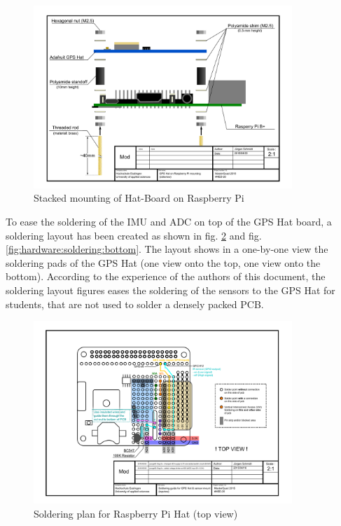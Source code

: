 \begin{figure}[H]
    \centering
    \includegraphics[width=0.87\textwidth]{fig/ch-rpi-hardware/A4_tech_draw_sideview_stackedMount}
    \caption{Stacked mounting of Hat-Board on Raspberry Pi}
    \label{fig:hardware:stackedMount}
\end{figure}

To ease the soldering of the IMU and ADC on top of the GPS Hat board, a soldering layout has been created as shown in fig. \ref{fig:hardware:soldering:top} and fig. \ref{fig:hardware:soldering:bottom}. The layout shows in a one-by-one view the soldering pads of the GPS Hat (one view onto the top, one view onto the bottom). According to the experience of the authors of this document, the soldering layout figures eases the soldering of the sensors to the GPS Hat for students, that are not used to solder a densely packed PCB.

\begin{figure}[H]
    \centering
    \includegraphics[width=0.87\textwidth]{fig/ch-rpi-hardware/A4_tech_draw_topview_gpshat_soldering}
    \caption{Soldering plan for Raspberry Pi Hat (top view)}
    \label{fig:hardware:soldering:top}
\end{figure}

